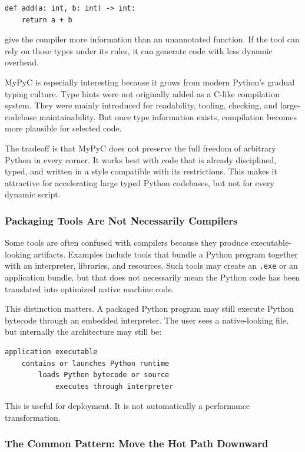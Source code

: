 \begin{verbatim}
def add(a: int, b: int) -> int:
    return a + b
\end{verbatim}

give the compiler more information than an unannotated function. If the tool can rely on those types under its rules, it can generate code with less dynamic overhead.

MyPyC is especially interesting because it grows from modern Python's gradual typing culture. Type hints were not originally added as a C-like compilation system. They were mainly introduced for readability, tooling, checking, and large-codebase maintainability. But once type information exists, compilation becomes more plausible for selected code.

The tradeoff is that MyPyC does not preserve the full freedom of arbitrary Python in every corner. It works best with code that is already disciplined, typed, and written in a style compatible with its restrictions. This makes it attractive for accelerating large typed Python codebases, but not for every dynamic script.

\subsubsection{Packaging Tools Are Not Necessarily Compilers}

Some tools are often confused with compilers because they produce executable-looking artifacts. Examples include tools that bundle a Python program together with an interpreter, libraries, and resources. Such tools may create an \texttt{.exe} or an application bundle, but that does not necessarily mean the Python code has been translated into optimized native machine code.

This distinction matters. A packaged Python program may still execute Python bytecode through an embedded interpreter. The user sees a native-looking file, but internally the architecture may still be:

\begin{verbatim}
application executable
    contains or launches Python runtime
        loads Python bytecode or source
            executes through interpreter
\end{verbatim}

This is useful for deployment. It is not automatically a performance transformation.

\subsubsection{The Common Pattern: Move the Hot Path Downward}

